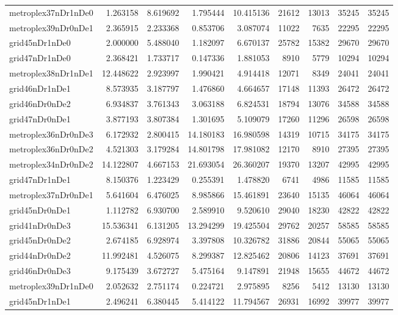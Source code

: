 \begin{longtable}{|l|r|r|r|r|r|r|r|r|}
metroplex37nDr1nDe0 & 1.263158 & 8.619692 & 1.795444 & 10.415136 & 21612 & 13013 & 35245 & 35245 \\
metroplex39nDr0nDe1 & 2.365915 & 2.233368 & 0.853706 & 3.087074 & 11022 & 7635 & 22295 & 22295 \\
grid45nDr1nDe0 & 2.000000 & 5.488040 & 1.182097 & 6.670137 & 25782 & 15382 & 29670 & 29670 \\
grid47nDr1nDe0 & 2.368421 & 1.733717 & 0.147336 & 1.881053 & 8910 & 5779 & 10294 & 10294 \\
metroplex38nDr1nDe1 & 12.448622 & 2.923997 & 1.990421 & 4.914418 & 12071 & 8349 & 24041 & 24041 \\
grid46nDr1nDe1 & 8.573935 & 3.187797 & 1.476860 & 4.664657 & 17148 & 11393 & 26472 & 26472 \\
grid46nDr0nDe2 & 6.934837 & 3.761343 & 3.063188 & 6.824531 & 18794 & 13076 & 34588 & 34588 \\
grid47nDr0nDe1 & 3.877193 & 3.807384 & 1.301695 & 5.109079 & 17260 & 11296 & 26598 & 26598 \\
metroplex36nDr0nDe3 & 6.172932 & 2.800415 & 14.180183 & 16.980598 & 14319 & 10715 & 34175 & 34175 \\
metroplex36nDr0nDe2 & 4.521303 & 3.179284 & 14.801798 & 17.981082 & 12170 & 8910 & 27395 & 27395 \\
metroplex34nDr0nDe2 & 14.122807 & 4.667153 & 21.693054 & 26.360207 & 19370 & 13207 & 42995 & 42995 \\
grid47nDr1nDe1 & 8.150376 & 1.223429 & 0.255391 & 1.478820 & 6741 & 4986 & 11585 & 11585 \\
metroplex37nDr0nDe1 & 5.641604 & 6.476025 & 8.985866 & 15.461891 & 23640 & 15135 & 46064 & 46064 \\
grid45nDr0nDe1 & 1.112782 & 6.930700 & 2.589910 & 9.520610 & 29040 & 18230 & 42822 & 42822 \\
grid41nDr0nDe3 & 15.536341 & 6.131205 & 13.294299 & 19.425504 & 29762 & 20257 & 58585 & 58585 \\
grid45nDr0nDe2 & 2.674185 & 6.928974 & 3.397808 & 10.326782 & 31886 & 20844 & 55065 & 55065 \\
grid44nDr0nDe2 & 11.992481 & 4.526075 & 8.299387 & 12.825462 & 20806 & 14123 & 37691 & 37691 \\
grid46nDr0nDe3 & 9.175439 & 3.672727 & 5.475164 & 9.147891 & 21948 & 15655 & 44672 & 44672 \\
metroplex39nDr1nDe0 & 2.052632 & 2.751174 & 0.224721 & 2.975895 & 8256 & 5412 & 13130 & 13130 \\
grid45nDr1nDe1 & 2.496241 & 6.380445 & 5.414122 & 11.794567 & 26931 & 16992 & 39977 & 39977 \\

\end{longtable}
